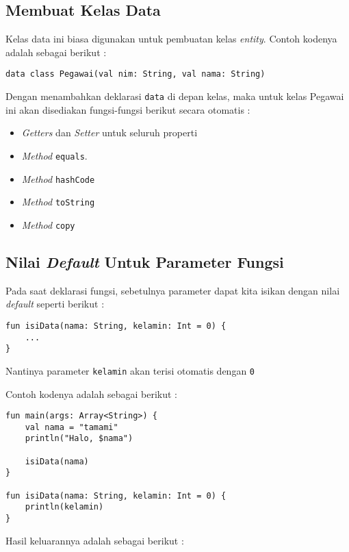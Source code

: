 \subsection{Membuat Kelas Data}

Kelas data ini biasa digunakan untuk pembuatan kelas \textit{entity}. Contoh kodenya adalah sebagai berikut :

\begin{lstlisting}
data class Pegawai(val nim: String, val nama: String)
\end{lstlisting}

Dengan menambahkan deklarasi \texttt{data} di depan kelas, maka untuk kelas Pegawai ini akan disediakan fungsi-fungsi berikut secara otomatis :

\begin{itemize}
\item \textit{Getters} dan \textit{Setter} untuk seluruh properti
\item \textit{Method} \texttt{equals}.
\item \textit{Method} \texttt{hashCode}
\item \textit{Method} \texttt{toString}
\item \textit{Method} \texttt{copy}
\end{itemize}

\subsection{Nilai \textit{Default} Untuk Parameter Fungsi}

Pada saat deklarasi fungsi, sebetulnya parameter dapat kita isikan dengan nilai \textit{default} seperti berikut :

\begin{lstlisting}
fun isiData(nama: String, kelamin: Int = 0) {
	...
}
\end{lstlisting}

Nantinya parameter \texttt{kelamin} akan terisi otomatis dengan \texttt{0}

Contoh kodenya adalah sebagai berikut :

\begin{lstlisting}
fun main(args: Array<String>) {
	val nama = "tamami"
	println("Halo, $nama")
	
	isiData(nama)
}

fun isiData(nama: String, kelamin: Int = 0) {
	println(kelamin)
}
\end{lstlisting}

Hasil keluarannya adalah sebagai berikut :

